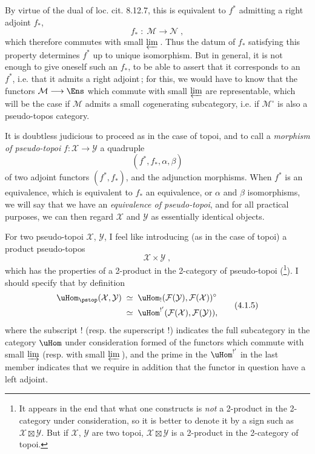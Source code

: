 By virtue of the dual of loc. cit. 8.12.7, this is equivalent to $f^*$ admitting a right adjoint $f_*$,
\[
f_* \;:\; \mathcal{M} \longrightarrow \mathcal{N}\;,
\tag*{(4.1.2)}
\]
which therefore commutes with small $\varprojlim$\,. Thus the datum of $f_*$ satisfying this property determines $f^*$ up to unique isomorphism. But in general, it is not enough to give oneself such an $f_*$, to be able to assert that it corresponds to an $f^*$, i.e. that it admits a right adjoint\,; for this, we would have to know that the functors $\mathcal{M}\longrightarrow\Ens$ which commute with small $\varprojlim$ are representable, which will be the case if $\mathcal{M}$ admits a small \textit{co}generating subcategory, i.e. if $\mathcal{M}^\circ$ is also a pseudo-topos category. %

\newpage


It is doubtless judicious to proceed as in the case of topoi, and to call a \textit{morphism of pseudo-topoi} $f:\mathcal{X}\longrightarrow\mathcal{Y}$ a quadruple
\[
(f^*,f_*,\alpha,\beta)
\tag*{(4.1.3)}
\]
of two adjoint functors $(f^*,f_*)$, and the adjunction morphisms. When $f^*$ is an equivalence, which is equivalent to $f_*$ an equivalence, or $\alpha$ and $\beta$ isomorphisms, we will say that we have an \textit{equivalence of pseudo-topoi}, and for all practical purposes, we can then regard $\mathcal{X}$ and $\mathcal{Y}$ as essentially identical objects.

For two pseudo-topoi $\mathcal{X}$, $\mathcal{Y}$, I feel like introducing (as in the case of topoi) a product pseudo-topos
\[
\mathcal{X}\times\mathcal{Y}\;,
\tag*{(4.1.4)}
\]
which has the properties of a 2-product in the 2-category of pseudo-topoi (\footnote{It appears in the end that what one constructs is \textit{not} a 2-product in the 2-category under consideration, so it is better to denote it by a sign such as $\mathcal{X}\boxtimes\mathcal{Y}$. But if $\mathcal{X}$, $\mathcal{Y}$ are two topoi, $\mathcal{X}\boxtimes\mathcal{Y}$ is a 2-product in the 2-category of topoi.}). I should specify that by definition
\[
\begin{aligned}
\uHom_{\pstop}(\mathcal{X},\mathcal{Y}) \;&\simeq\; \uHom_!(\mathcal{F}(\mathcal{Y}),\mathcal{F}(\mathcal{X}))^\circ\\
&\simeq\; \uHom^{!'}(\mathcal{F}(\mathcal{X}),\mathcal{F}(\mathcal{Y})),
\end{aligned}
\tag*{(4.1.5)}
\]
where the subscript ! (resp. the superscript !) indicates the full subcategory in the category $\uHom$ under consideration formed of the functors which commute with small $\varinjlim$ (resp. with small
$\varprojlim$\,), and the prime in the $\uHom^{!'}$ in the last member indicates that we require in addition that the functor in question have a left adjoint.

